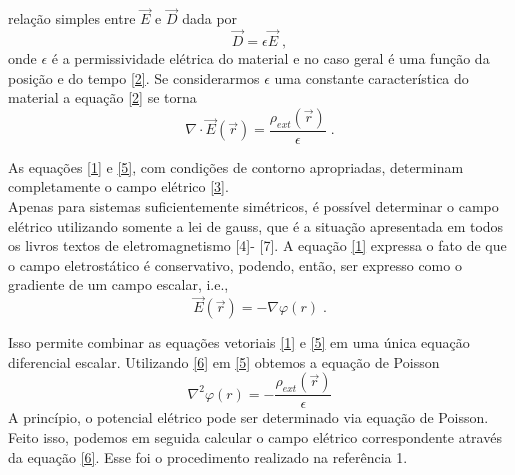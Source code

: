 \documentclass[brazilian,10.7pt,a4paper]{article}
\begin{document}
\begin{multicols}{2}
relação simples entre $\vec{E}$ e $\vec{D}$ dada por
\\
\begin{equation}\label{4}
\vec{D} = \epsilon\vec{E}\;,
\end{equation}
onde $\epsilon$ é a permissividade elétrica do material e no caso geral é uma função da posição e do tempo \ref{2}. Se considerarmos $\epsilon$ uma constante característica do material a equação \eqref{2} se torna
\\
\begin{equation}\label{5}
\nabla\cdot\vec{E}(\vec{r})=\frac{\rho_{ext}(\vec{r})}{\epsilon}\;.
\end{equation}
\par As equações \eqref{1} e \eqref{5}, com condições de contorno apropriadas, determinam completamente o campo elétrico \ref{3}.\\
Apenas para sistemas suficientemente simétricos, é possível determinar o campo elétrico utilizando somente a lei de gauss, que é a situação apresentada em todos os livros textos de eletromagnetismo [4]- [7]. A equação \eqref{1} expressa o fato de que o campo eletrostático é conservativo, podendo, então, ser expresso como o gradiente de um campo escalar, i.e., %
\\
\begin{equation}\label{6}
\vec{E}(\vec{r})= -\nabla\varphi(r)\;.
\end{equation}
\par Isso permite combinar as equações vetoriais \eqref{1} e \eqref{5} em uma única equação diferencial escalar. Utilizando \eqref{6} em \eqref{5} obtemos a equação de Poisson
\\
\begin{equation}\label{7}
\nabla^{2}\varphi(r)=-\frac{\rho_{ext}(\vec{r})}{\epsilon}
\end{equation}
\vspace{1pt}
A princípio, o potencial elétrico pode ser determinado via equação de Poisson. Feito isso, podemos em seguida calcular o campo elétrico correspondente através da equação \eqref{6}. Esse foi o procedimento realizado na referência 1.






\end{multicols}
\end{document}
